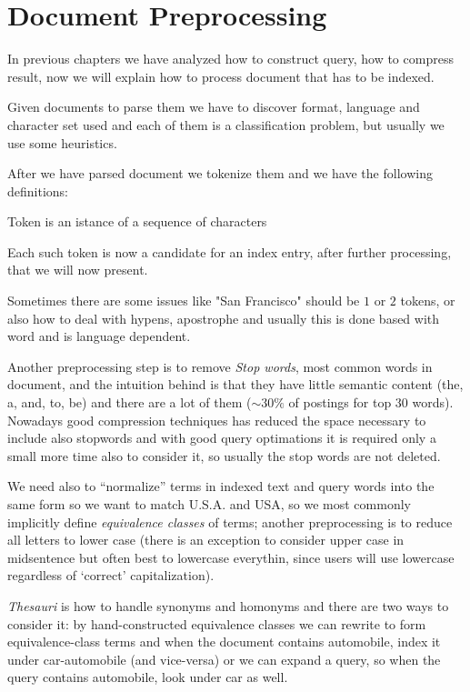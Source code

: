 \chapter{Document Preprocessing}
In previous chapters we have analyzed how to construct query, how to compress result,
now we will explain how to process document that has to be indexed.

Given documents to parse them we have to discover format, language and character set
used and each of them is a classification problem, but usually we use some heuristics.

After we have parsed document we tokenize them and we have the following definitions:
\begin{defi}
     Token is an istance of a sequence of characters
\end{defi}
Each such token is now a candidate for an index entry, after further processing,
that we will now present.

Sometimes there are some issues like "San Francisco" should be $1$ or $2$ tokens, or
also how to deal with hypens, apostrophe and usually this is done based with word
and is language dependent.

Another preprocessing step is to remove \emph{Stop words}, most common words in
document, and the intuition behind is that they have little semantic content
(the, a, and, to, be) and there are a lot of them ($\sim 30\%$ of postings 
for top $30$ words).\newline
Nowadays good compression techniques has reduced the space necessary to include also
stopwords and with good query optimations it is required only a small more time also
to consider it, so usually the stop words are not deleted.

We need also to “normalize” terms in indexed text and query words into the same form
so we want to match U.S.A. and USA, so we most commonly implicitly define 
\emph{equivalence classes} of terms; another preprocessing is to reduce all letters
to lower case (there is an exception to consider upper case in midsentence but often
best to lowercase everythin, since users will use lowercase regardless
of ‘correct’ capitalization).

\emph{Thesauri} is how to handle synonyms and homonyms and there are two ways to consider it: by hand-constructed equivalence classes we can rewrite to form 
equivalence-class terms and when the document contains automobile, index it 
under car-automobile (and vice-versa) or we can expand a query, so when the query
contains automobile, look under car as well.

